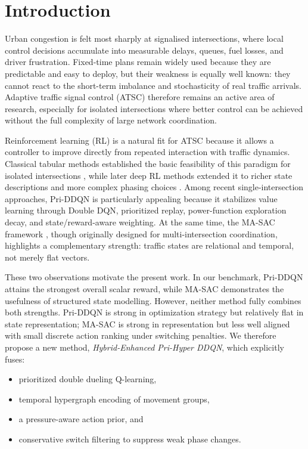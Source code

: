 \documentclass[conference]{IEEEtran}
\begin{document}
\section{Introduction}
Urban congestion is felt most sharply at signalised intersections,
where local control decisions accumulate into measurable delays,
queues, fuel losses, and driver frustration. Fixed-time plans remain
widely used because they are predictable and easy to deploy, but
their weakness is equally well known: they cannot react to the
short-term imbalance and stochasticity of real traffic arrivals.
Adaptive traffic signal control (ATSC) therefore remains an active
area of research, especially for isolated intersections where better
control can be achieved without the full complexity of large network
coordination.

Reinforcement learning (RL) is a natural fit for ATSC because it
allows a controller to improve directly from repeated interaction
with traffic dynamics. Classical tabular methods established the
basic feasibility of this paradigm for isolated intersections
\cite{ElTantawy2014DesignORH,Touhbi2017AdaptiveTSM}, while later
deep RL methods extended it to richer state descriptions and more
complex phasing choices \cite{Haydari2020DeepRLC,Gu2020DoubleDQD}.
Among recent single-intersection approaches, Pri-DDQN
\cite{Zheng2024PriDDQNLAG} is particularly appealing because it
stabilizes value learning through Double DQN, prioritized replay,
power-function exploration decay, and state/reward-aware weighting.
At the same time, the MA-SAC framework
\cite{Wang2024TowardMRP}, though originally designed for
multi-intersection coordination, highlights a complementary strength:
traffic states are relational and temporal, not merely flat vectors.

These two observations motivate the present work. In our benchmark,
Pri-DDQN attains the strongest overall scalar reward, while MA-SAC
demonstrates the usefulness of structured state modelling.
However, neither method fully combines both strengths. Pri-DDQN is
strong in optimization strategy but relatively flat in state
representation; MA-SAC is strong in representation but less well
aligned with small discrete action ranking under switching
penalties. We therefore propose a new method,
\emph{Hybrid-Enhanced Pri-Hyper DDQN}, which explicitly fuses:

\begin{itemize}
\item prioritized double dueling Q-learning,
\item temporal hypergraph encoding of movement groups,
\item a pressure-aware action prior, and
\item conservative switch filtering to suppress weak phase changes.
\end{itemize}
\end{document}
